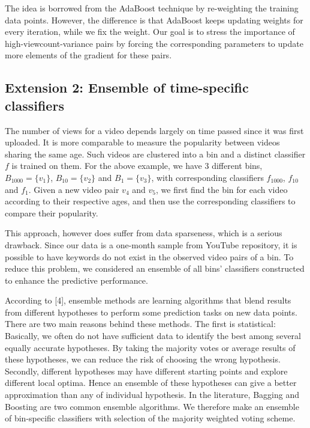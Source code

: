 		The idea is borrowed from the AdaBoost technique by re-weighting the training data points. However, the difference is that AdaBoost keeps updating weights for every iteration, while we fix the weight. Our goal is to stress the importance of high-viewcount-variance pairs by forcing the corresponding parameters to update more elements of the gradient for these pairs. 
	 
\subsection{Extension 2: Ensemble of time-specific classifiers}
\label{subsec:ext2}
	The number of views for a video depends largely on time passed since it was first uploaded. It is more comparable to measure the popularity between videos sharing the same age. Such videos are clustered into a bin and a distinct classifier $f$ is trained on them. For the above example, we have 3 different bins, $B_{1000}=\{v_1\}$, $B_{10}=\{v_2\}$ and $B_{1}=\{v_3\}$, with corresponding classifiers $f_{1000}$, $f_{10}$ and $f_{1}$. Given a new video pair $v_4$ and $v_5$, we first find the bin for each video according to their respective ages, and then use the corresponding classifiers to compare their popularity. 

	This approach, however does suffer from data sparseness, which is a serious drawback. Since our data is a one-month sample from YouTube repository, it is possible to have keywords do not exist in the observed video pairs of a bin. To reduce this problem, we considered an ensemble of all bins' classifiers constructed to enhance the predictive performance. 

	According to [4], ensemble methods are learning algorithms that blend results from different hypotheses to perform some prediction tasks on new data points. There are two main reasons behind these methods. The first is statistical: Basically, we often do not have sufficient data to identify the best among several equally accurate hypotheses. By taking the majority votes or average results of these hypotheses, we can reduce the risk of choosing the wrong hypothesis. Secondly, different hypotheses may have different starting points and explore different local optima. Hence an ensemble of these hypotheses can give a better approximation than any of individual hypothesis. In the literature, Bagging and Boosting are two common ensemble algorithms.  We therefore make an ensemble of bin-specific classifiers with selection of the majority weighted voting scheme.
	

